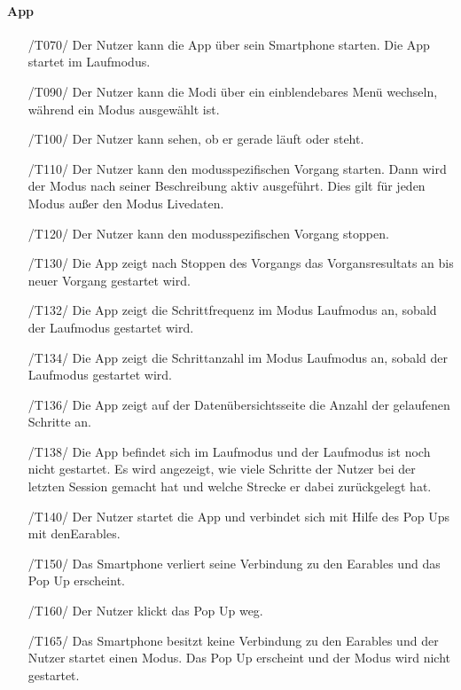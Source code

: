 \documentclass[a4paper,12pt]{article}
\begin{document}
  \paragraph{App}
    \begin{itemize}
    \item[/T070/] Der Nutzer kann die App über sein Smartphone starten. Die App startet im Laufmodus.
    \item[/T090/] Der Nutzer kann die Modi über ein einblendebares Menü wechseln, während ein Modus ausgewählt ist.
    \item[/T100/] Der Nutzer kann sehen, ob er gerade \glqq läuft\grqq{} oder \glqq steht\grqq{}.
    \item[/T110/] Der Nutzer kann den modusspezifischen \Gls{Vorgang} starten. Dann wird der Modus nach seiner Beschreibung aktiv ausgeführt. Dies gilt für jeden Modus außer den Modus \glqq Livedaten\grqq.
    \item[/T120/] Der Nutzer kann den modusspezifischen \Gls{Vorgang} stoppen.
    \item[/T130/] Die App zeigt nach Stoppen des Vorgangs das Vorgansresultats an bis neuer \Gls{Vorgang} gestartet wird.
    \item[/T132/] Die App zeigt die \gls{Schrittfrequenz} im Modus \glqq{}Laufmodus\grqq{} an, sobald der Laufmodus gestartet wird.
    \item[/T134/] Die App zeigt die Schrittanzahl im Modus \glqq{}Laufmodus\grqq{} an, sobald der Laufmodus gestartet wird.
    \item[/T136/] Die App zeigt auf der Datenübersichtsseite die Anzahl der gelaufenen Schritte an.
    \item[/T138/] Die App befindet sich im Laufmodus und der Laufmodus ist noch nicht gestartet. Es wird angezeigt, wie viele Schritte der Nutzer bei der letzten Session gemacht hat und welche Strecke er dabei zurückgelegt hat.
    \item[/T140/] Der Nutzer startet die App und verbindet sich mit Hilfe des Pop Ups mit den\gls{Earables}.
    \item[/T150/] Das Smartphone verliert seine Verbindung zu den \gls{Earables} und das Pop Up erscheint.
    \item[/T160/] Der Nutzer klickt das Pop Up weg.
    \item[/T165/] Das Smartphone besitzt keine Verbindung zu den \gls{Earables} und der Nutzer startet einen Modus. Das Pop Up erscheint und der Modus wird nicht gestartet.
  \end{itemize}
\end{document}
